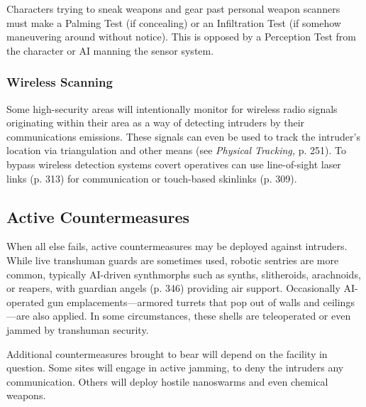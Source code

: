 Characters trying to sneak weapons and gear past personal weapon scanners must make a Palming Test (if concealing) or an Infiltration Test (if somehow maneuvering around without notice). This is opposed by a Perception Test from the character or AI manning the sensor system. 

\subsubsection{Wireless Scanning} 

Some high-security areas will intentionally monitor for wireless radio signals originating within their area as a way of detecting intruders by their communications emissions. These signals can even be used to track the intruder's location via triangulation and other means (see \textit{Physical Tracking,} p. 251). To bypass wireless detection systems covert operatives can use line-of-sight laser links (p. 313) for communication or touch-based skinlinks (p. 309). 

\subsection{Active Countermeasures} 

When all else fails, active countermeasures may be deployed against intruders. While live transhuman guards are sometimes used, robotic sentries are more common, typically AI-driven synthmorphs such as synths, slitheroids, arachnoids, or reapers, with guardian angels (p. 346) providing air support. Occasionally AI-operated gun emplacements—armored turrets that pop out of walls and ceilings—are also applied. In some circumstances, these shells are teleoperated or even jammed by transhuman security. 

Additional countermeasures brought to bear will depend on the facility in question. Some sites will engage in active jamming, to deny the intruders any communication. Others will deploy hostile nanoswarms and even chemical weapons. 